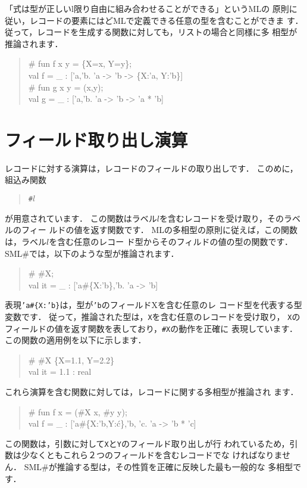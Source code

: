 \documentclass{jbook}
\newcommand{\smlsharp}{SML\#}
\begin{document}
	「式は型が正しいl限り自由に組み合わせることができる」というMLの
原則に従い，レコードの要素にはどMLで定義できる任意の型を含むことができま
す．
	従って，レコードを生成する関数に対しても，リストの場合と同様に多
相型が推論されます．
\begin{tt}\begin{quote}
\# fun f x y = \{X=x, Y=y\};\\
val f = \_ : ['a,'b. 'a -> 'b -> \{X:'a, Y:'b\}]\\
\# fun g x y = (x,y);\\
val g = \_ : ['a,'b. 'a -> 'b -> 'a * 'b]
\end{quote}\end{tt}

\section{フィールド取り出し演算}
\label{sec:extensionFieldselection}

	レコードに対する演算は，レコードのフィールドの取り出しです．
	このめに，組込み関数
\begin{tt}\begin{quote}
{\tt \#$l$}
\end{quote}\end{tt}
が用意されています．
	この関数はラベル$l$を含むレコードを受け取り，そのラベルのフィー
ルドの値を返す関数です．
	MLの多相型の原則に従えば，この関数は，ラベル$l$を含む任意のレコー
ド型からそのフィルドの値の型の関数です．
	\smlsharp{}では，以下のような型が推論されます．
\begin{tt}\begin{quote}
\# \#X;\\
val it = \_ : ['a\#\{X:'b\},'b. 'a -> 'b]
\end{quote}\end{tt}
	表現{\tt 'a\#\{X:'b\}}は，型が{\tt 'b}のフィールドXを含む任意のレ
コード型を代表する型変数です．
	従って，推論された型は，{\tt X}を含む任意のレコードを受け取り，
{\tt X}のフィールドの値を返す関数を表しており，{\tt \#X}の動作を正確に
表現しています．
	この関数の適用例を以下に示します．
\begin{tt}\begin{quote}
\# \#X \{X=1.1, Y=2.2\}\\
val it = 1.1 : real
\end{quote}\end{tt}
	これら演算を含む関数に対しては，レコードに関する多相型が推論され
ます．
\begin{tt}\begin{quote}
\# fun f x = (\#X x, \#y y);\\
val f = \_ : ['a\#\{X:'b,Y:\'c\},'b, 'c. 'a -> 'b * 'c]
\end{quote}\end{tt}
	この関数は，引数に対して{\tt X}と{\tt Y}のフィールド取り出しが行
われているため，引数は少なくともこれら２つのフィールドを含むレコードでな
ければなりません．
	\smlsharp{}が推論する型は，その性質を正確に反映した最も一般的な
多相型です．
\end{document}
